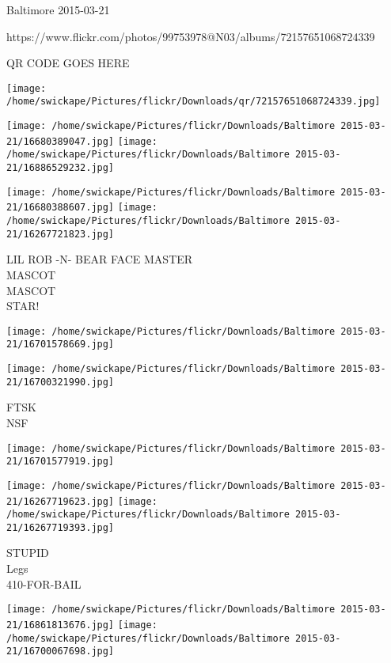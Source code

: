 \documentclass[10pt,letterpaper]{article}
\begin{document}
Baltimore 2015-03-21

https://www.flickr.com/photos/99753978@N03/albums/72157651068724339

QR CODE GOES HERE

\texttt{[image: /home/swickape/Pictures/flickr/Downloads/qr/72157651068724339.jpg]}
\pagebreak

\texttt{[image: /home/swickape/Pictures/flickr/Downloads/Baltimore 2015-03-21/16680389047.jpg]}
\texttt{[image: /home/swickape/Pictures/flickr/Downloads/Baltimore 2015-03-21/16886529232.jpg]}

\texttt{[image: /home/swickape/Pictures/flickr/Downloads/Baltimore 2015-03-21/16680388607.jpg]}
\texttt{[image: /home/swickape/Pictures/flickr/Downloads/Baltimore 2015-03-21/16267721823.jpg]}

LIL ROB {-}N{-} BEAR FACE MASTER\\
MASCOT\\
MASCOT\\
STAR!\\
\pagebreak

\texttt{[image: /home/swickape/Pictures/flickr/Downloads/Baltimore 2015-03-21/16701578669.jpg]}

\vspace{0.25in}
\texttt{[image: /home/swickape/Pictures/flickr/Downloads/Baltimore 2015-03-21/16700321990.jpg]}

FTSK\\
NSF\\
\pagebreak

\texttt{[image: /home/swickape/Pictures/flickr/Downloads/Baltimore 2015-03-21/16701577919.jpg]}

\vspace{0.25in}
\texttt{[image: /home/swickape/Pictures/flickr/Downloads/Baltimore 2015-03-21/16267719623.jpg]}
\texttt{[image: /home/swickape/Pictures/flickr/Downloads/Baltimore 2015-03-21/16267719393.jpg]}

STUPID\\
Legs\\
410{-}FOR{-}BAIL\\
\pagebreak

\texttt{[image: /home/swickape/Pictures/flickr/Downloads/Baltimore 2015-03-21/16861813676.jpg]}
\texttt{[image: /home/swickape/Pictures/flickr/Downloads/Baltimore 2015-03-21/16700067698.jpg]}
\end{document}
